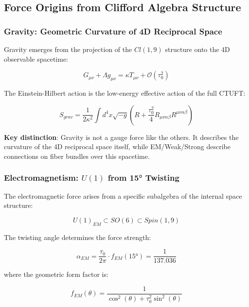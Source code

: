 \subsection{Force Origins from Clifford Algebra Structure}

\subsubsection{Gravity: Geometric Curvature of 4D Reciprocal Space}

Gravity emerges from the projection of the $Cl(1,9)$ structure onto the 4D observable spacetime:

\begin{equation}
    G_{\mu\nu} + \Lambda g_{\mu\nu} = \kappa T_{\mu\nu} + \mathcal{O}(\tau_0^2)
\end{equation}

The Einstein-Hilbert action is the low-energy effective action of the full CTUFT:

\begin{equation}
    S_{grav} = \frac{1}{2\kappa^2} \int d^4x \sqrt{-g} \left(R + \frac{\tau_0^2}{4} R_{\mu\nu\alpha\beta} R^{\mu\nu\alpha\beta}\right)
\end{equation}

\textbf{Key distinction}: Gravity is not a gauge force like the others. It describes the curvature of the 4D reciprocal space itself, while EM/Weak/Strong describe connections on fiber bundles over this spacetime.

\subsubsection{Electromagnetism: $U(1)$ from 15° Twisting}

The electromagnetic force arises from a specific subalgebra of the internal space structure:

\begin{equation}
    U(1)_{EM} \subset SO(6) \subset Spin(1,9)
\end{equation}

The twisting angle determines the force strength:

\begin{equation}
    \alpha_{EM} = \frac{\tau_0}{2\pi} \cdot f_{EM}(15°) = \frac{1}{137.036}
\end{equation}

where the geometric form factor is:

\begin{equation}
    f_{EM}(\theta) = \frac{1}{\cos^2(\theta) + \tau_0^2 \sin^2(\theta)}
\end{equation}

